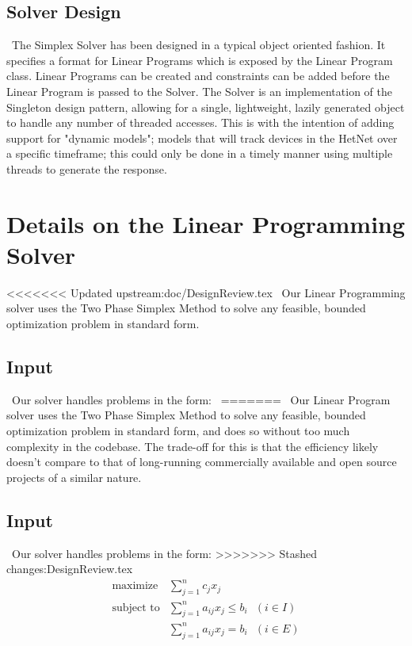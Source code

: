 \documentclass[11pt]{article}
\begin{document}
\subsection{Solver Design}
~\indent The Simplex Solver has been designed in a typical object oriented fashion. 
It specifies a format for Linear Programs which is exposed by the Linear Program
class. Linear Programs can be created and constraints can be added before 
the Linear Program is passed to the Solver. The Solver is an implementation of 
the Singleton design pattern, allowing for a single, lightweight, lazily generated 
object to handle any number of threaded accesses. This is with the intention of 
adding support for "dynamic models"; models that will track devices in the HetNet
over a specific timeframe; this could only be done in a timely manner using 
multiple threads to generate the response. 

\section{Details on the Linear Programming Solver}

<<<<<<< Updated upstream:doc/DesignReview.tex
~\indent Our Linear Programming solver uses the Two Phase 
Simplex Method to solve any feasible, bounded optimization problem in standard form.
    \subsection{Input}
~\indent Our solver handles problems in the form:~\cite{chvatal83}
=======
~\indent Our Linear Program solver uses the Two Phase 
Simplex Method 
\cite{chvatal83} to solve any feasible, bounded optimization 
problem in standard form, and does so without too much complexity in the 
codebase.  The trade-off for this is that the efficiency likely doesn't 
compare to that of long-running commercially available and open source 
projects of a similar nature.
    \subsection{Input}
~\indent Our solver handles problems in the form:
>>>>>>> Stashed changes:DesignReview.tex
\begin{eqnarray*}
\mbox{maximize}& \sum\limits_{j=1}^n c_jx_j\\
\mbox{subject to}& \sum\limits_{j=1}^n a_{ij}x_j \leq b_i\mbox{\ \ }(i \in I)\\
& \sum\limits_{j=1}^n a_{ij}x_j = b_i\mbox{\ \ }(i \in E)
\end{eqnarray*}
\end{document}
